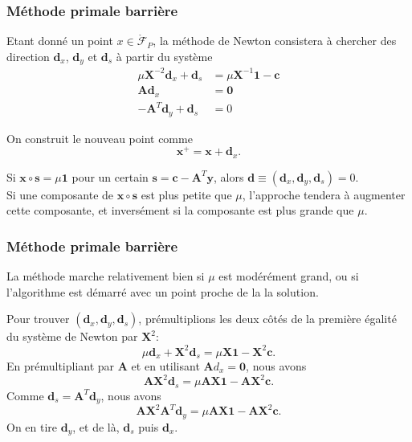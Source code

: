 \documentclass[usepdftitle=false]{beamer}
\def\bc{\boldsymbol{c}}
\def\bd{\boldsymbol{d}}
\def\bs{\boldsymbol{s}}
\def\bx{\boldsymbol{x}}
\def\by{\boldsymbol{y}}
\def\bA{\boldsymbol{A}}
\def\bX{\boldsymbol{X}}
\def\bzero{\boldsymbol{0}}
\def\bone{\boldsymbol{1}}
\begin{document}
\begin{frame}
\frametitle{Méthode primale barrière}

Etant donné un point $x \in \mathring{\mathcal{F}}_P$, la méthode de Newton consistera à chercher des direction $\bd_x$, $\bd_y$ et $\bd_s$ à partir du système
\begin{align*}
\mu \bX^{-2} \bd_x + \bd_s &= \mu \bX^{-1}\bone - \bc \\
\bA\bd_x &= \bzero \\
-\bA^T\bd_y + \bd_s & = 0
\end{align*}

\mbox{}

On construit le nouveau point comme
\[
\bx^+ = \bx + \bd_x.
\]

\mbox{}

Si $\bx \circ \bs = \mu \bone$ pour un certain $\bs = \bc - \bA^T\by$, alors $\bd \equiv (\bd_x, \bd_y, \bd_s) = 0$.\\
Si une composante de $\bx \circ \bs$ est plus petite que $\mu$, l'approche tendera à augmenter cette composante, et inversément si la composante est plus grande que $\mu$.

\end{frame}

\begin{frame}
\frametitle{Méthode primale barrière}

La méthode marche relativement bien si $\mu$ est modérément grand, ou si l'algorithme est démarré avec un point proche de la la solution.

\mbox{}

Pour trouver $(\bd_x, \bd_y, \bd_s)$, prémultiplions les deux côtés de la première égalité du système de Newton par $\bX^2$:
\[
\mu \bd_x + \bX^2 \bd_s = \mu \bX \bone - \bX^2 \bc.
\]
En prémultipliant par $\bA$ et en utilisant $\bA d_x = \bzero$, nous avons
\[
\bA \bX^2 \bd_s = \mu \bA \bX \bone - \bA \bX^2 \bc.
\]
Comme $\bd_s = \bA^T \bd_y$, nous avons
\[
\bA \bX^2 \bA^T \bd_y = \mu \bA \bX \bone - \bA \bX^2 \bc.
\]
On en tire $\bd_y$, et de là, $\bd_s$ puis $\bd_x$.

\end{frame}
\end{document}
